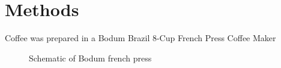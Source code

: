 \section{Methods}
\begin{outline}[enumerate]
	\1 Coffee was prepared in a Bodum Brazil 8-Cup French Press Coffee Maker
\end{outline}
\begin{figure}
    
    \caption{Schematic of Bodum french press}
    \label{fig:press_diagram}
\end{figure}
